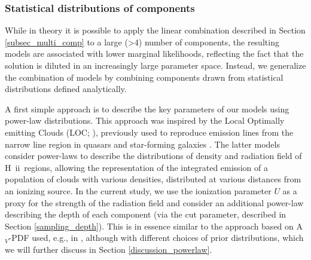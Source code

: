\documentclass{aa}
\newcommand{\hii}{H~{\sc ii}}
\begin{document}
\subsubsection{Statistical distributions of components}
\label{broken_plaw_models}

While in theory it is possible to apply the linear combination described in Section \ref{subsec_multi_comp} to a large (>4) number of components, the resulting models are associated with lower marginal likelihoods, reflecting the fact that the solution is diluted in an increasingly large parameter space. Instead, we generalize the combination of models by combining components drawn from statistical distributions defined analytically. 

A first simple approach is to describe the key parameters of our models using power-law distributions. This approach was inspired by the Local Optimally emitting Clouds (LOC; \citealt{Baldwin_1995}), previously used to reproduce emission lines from the narrow line region in quasars and star-forming galaxies \citep{Ferguson_1997,richardson_interpreting_2014,richardson_interpreting_2016}. The latter models consider power-laws to describe the distributions of density and radiation field of \hii\ regions, allowing the representation of the integrated emission of a population of clouds with various densities, distributed at various distances from an ionizing source. In the current study, we use the ionization parameter $U$ as a proxy for the strength of the radiation field and consider an additional power-law describing the depth of each component (via the cut parameter, described in Section \ref{sampling_depth}). This is in essence similar to the approach based on A$_V$-PDF used, e.g., in \cite{Bisbas_2019, Bisbas_2023}, although with different choices of prior distributions, which we will further discuss in Section \ref{discussion_powerlaw}. 
\end{document}
